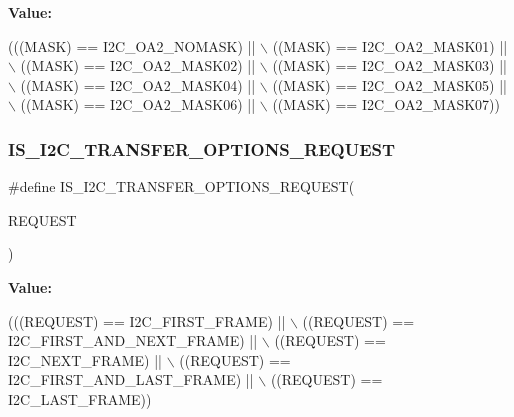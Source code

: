 {\bfseries Value\+:}
\begin{DoxyCode}
(((MASK) == I2C\_OA2\_NOMASK)  || \(\backslash\)
                                         ((MASK) == I2C\_OA2\_MASK01) || \(\backslash\)
                                         ((MASK) == I2C\_OA2\_MASK02) || \(\backslash\)
                                         ((MASK) == I2C\_OA2\_MASK03) || \(\backslash\)
                                         ((MASK) == I2C\_OA2\_MASK04) || \(\backslash\)
                                         ((MASK) == I2C\_OA2\_MASK05) || \(\backslash\)
                                         ((MASK) == I2C\_OA2\_MASK06) || \(\backslash\)
                                         ((MASK) == I2C\_OA2\_MASK07))
\end{DoxyCode}
\mbox{\label{group___i2_c___private___macro_ga8f3522af9ffef268641698ac80f77859}} 
\subsubsection{\texorpdfstring{I\+S\+\_\+\+I2\+C\+\_\+\+T\+R\+A\+N\+S\+F\+E\+R\+\_\+\+O\+P\+T\+I\+O\+N\+S\+\_\+\+R\+E\+Q\+U\+E\+ST}{IS\_I2C\_TRANSFER\_OPTIONS\_REQUEST}}
{\footnotesize\ttfamily \#define I\+S\+\_\+\+I2\+C\+\_\+\+T\+R\+A\+N\+S\+F\+E\+R\+\_\+\+O\+P\+T\+I\+O\+N\+S\+\_\+\+R\+E\+Q\+U\+E\+ST(\begin{DoxyParamCaption}\item[{}]{R\+E\+Q\+U\+E\+ST }\end{DoxyParamCaption})}

{\bfseries Value\+:}
\begin{DoxyCode}
(((REQUEST) == I2C\_FIRST\_FRAME)          || \(\backslash\)
                                                   ((REQUEST) == I2C\_FIRST\_AND\_NEXT\_FRAME) || \(\backslash\)
                                                   ((REQUEST) == I2C\_NEXT\_FRAME)           || \(\backslash\)
                                                   ((REQUEST) == I2C\_FIRST\_AND\_LAST\_FRAME) || \(\backslash\)
                                                   ((REQUEST) == I2C\_LAST\_FRAME))
\end{DoxyCode}
\mbox{\label{group___i2_c___private___macro_gafaa6130d7e7e11240349d9e1476c7f06}} 

